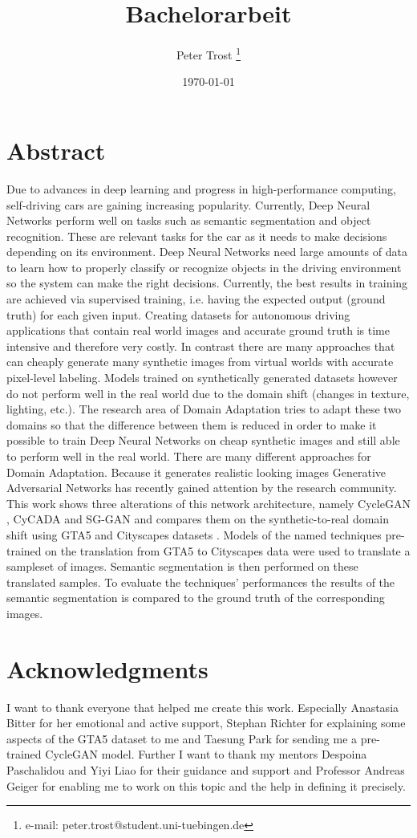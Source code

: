 \documentclass[a4paper,cleardoubleempty,BCOR1cm]{scrbook}
\title{Bachelorarbeit}
\author{Peter Trost \thanks{e-mail: peter.trost@student.uni-tuebingen.de}}
\date{\today}
\begin{document}


\chapter*{Abstract}
Due to advances in deep learning and progress in high-performance computing, self-driving cars are gaining increasing popularity. Currently, Deep Neural Networks perform well on tasks such as semantic segmentation and object recognition. These are relevant tasks for the car as it needs to make decisions depending on its environment. Deep Neural Networks need large amounts of data to learn how to properly classify or recognize objects in the driving environment so the system can make the right decisions. Currently, the best results in training are achieved via supervised training, i.e. having the expected output (ground truth) for each given input. Creating datasets for autonomous driving applications that contain real world images and accurate ground truth is time intensive and therefore very costly. In contrast there are many approaches that can cheaply generate many synthetic images from virtual worlds with accurate pixel-level labeling. Models trained on synthetically generated datasets however do not perform well in the real world due to the domain shift (changes in texture, lighting, etc.). The research area of Domain Adaptation tries to adapt these two domains so that the difference between them is reduced in order to make it possible to train Deep Neural Networks on cheap synthetic images and still able to perform well in the real world. There are many different approaches for Domain Adaptation. Because it generates realistic looking images Generative Adversarial Networks \cite{NIPS2014_5423} has recently gained attention by the research community. This work shows three alterations of this network architecture, namely CycleGAN \cite{DBLP:journals/corr/ZhuPIE17}, CyCADA \cite{DBLP:journals/corr/abs-1711-03213} and SG-GAN \cite{DBLP:journals/corr/abs-1801-01726} and compares them on the synthetic-to-real domain shift using GTA5 \cite{Richter_2016_ECCV} and Cityscapes datasets \cite{Cordts_2016_CVPR}. Models of the named techniques pre-trained on the translation from GTA5 to Cityscapes data were used to translate a sampleset of images. Semantic segmentation is then performed on these translated samples. To evaluate the techniques' performances the results of the semantic segmentation is compared to the ground truth of the corresponding images.


\chapter*{Acknowledgments}
I want to thank everyone that helped me create this work. Especially Anastasia Bitter for her emotional and active support, Stephan Richter for explaining some aspects of the GTA5 dataset to me and Taesung Park for sending me a pre-trained CycleGAN model. Further I want to thank my mentors Despoina Paschalidou and Yiyi Liao for their guidance and support and Professor Andreas Geiger for enabling me to work on this topic and the help in defining it precisely.
\end{document}
